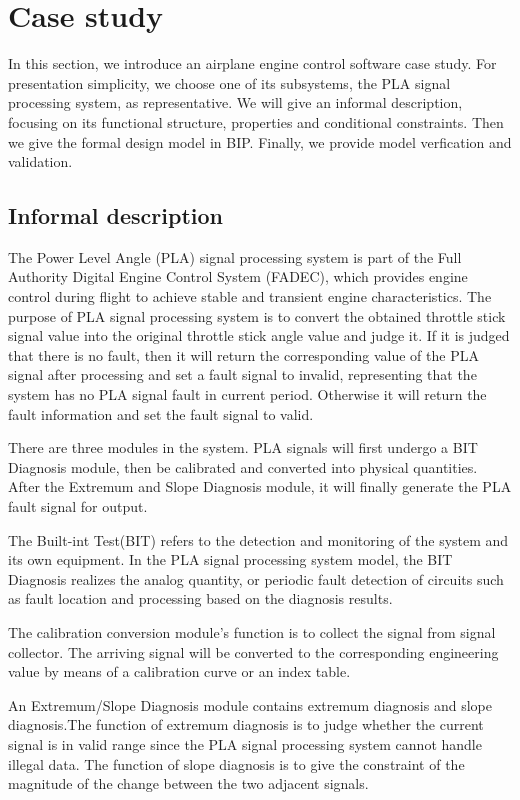 
\section{Case study}
In this section, we introduce an airplane engine control software case study. For presentation simplicity, we choose one of its subsystems, the PLA signal processing system, as representative. We will give an informal description, focusing on its functional structure, properties and conditional constraints. Then we give the formal design model in BIP. Finally, we provide model verfication and validation.

\subsection{Informal description}
The Power Level Angle (PLA) signal processing system is part of the Full Authority Digital Engine Control System (FADEC), which provides engine control during flight to achieve stable and transient engine characteristics. The purpose of PLA signal processing system is to convert the obtained throttle stick signal value into the original throttle stick angle value and judge it. If it is judged that there is no fault, then it will return the corresponding value of the PLA signal after processing and set a fault signal to invalid, representing that the system has no PLA signal fault in current period. Otherwise it will return the fault information and set the fault signal to valid.

There are three modules in the system. PLA signals will first undergo a BIT Diagnosis module, then be calibrated and converted into physical quantities. After the Extremum and Slope Diagnosis module, it will finally generate the PLA fault signal for output.

The Built-int Test(BIT) refers to the detection and monitoring of the system and its own equipment. In the PLA signal processing system model, the BIT Diagnosis realizes the analog quantity, or periodic fault detection of circuits such as fault location and processing based on the diagnosis results.

The calibration conversion module's function is to collect the signal from signal collector. The arriving signal will be converted to the corresponding engineering value by means of a calibration curve or an index table.

An Extremum/Slope Diagnosis module contains extremum diagnosis and slope diagnosis.The function of extremum diagnosis is to judge whether the current signal is in valid range since the PLA signal processing system cannot handle illegal data. The function of slope diagnosis is to give the constraint of the magnitude of the change between the two adjacent signals.

